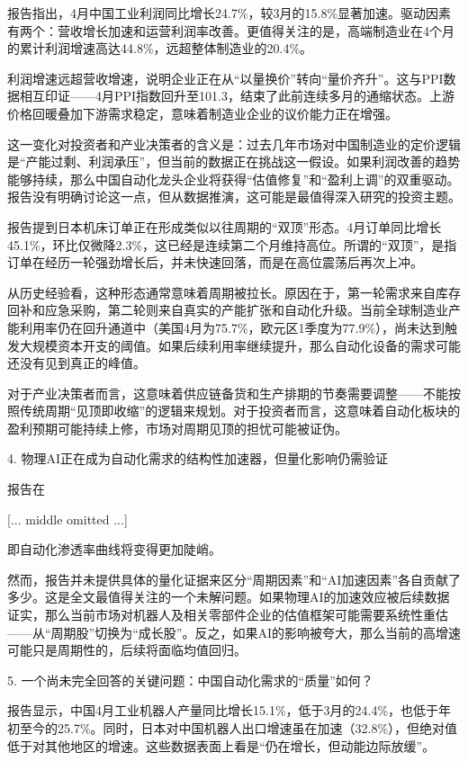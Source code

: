 \documentclass[11pt]{ctexart}
\begin{document}
报告指出，4月中国工业利润同比增长24.7\%，较3月的15.8\%显著加速。驱动因素有两个：营收增长加速和运营利润率改善。更值得关注的是，高端制造业在4个月的累计利润增速高达44.8\%，远超整体制造业的20.4\%。

利润增速远超营收增速，说明企业正在从“以量换价”转向“量价齐升”。这与PPI数据相互印证——4月PPI指数回升至101.3，结束了此前连续多月的通缩状态。上游价格回暖叠加下游需求稳定，意味着制造业企业的议价能力正在增强。

这一变化对投资者和产业决策者的含义是：过去几年市场对中国制造业的定价逻辑是“产能过剩、利润承压”，但当前的数据正在挑战这一假设。如果利润改善的趋势能够持续，那么中国自动化龙头企业将获得“估值修复”和“盈利上调”的双重驱动。报告没有明确讨论这一点，但从数据推演，这可能是最值得深入研究的投资主题。

报告提到日本机床订单正在形成类似以往周期的“双顶”形态。4月订单同比增长45.1\%，环比仅微降2.3\%，这已经是连续第二个月维持高位。所谓的“双顶”，是指订单在经历一轮强劲增长后，并未快速回落，而是在高位震荡后再次上冲。

从历史经验看，这种形态通常意味着周期被拉长。原因在于，第一轮需求来自库存回补和应急采购，第二轮则来自真实的产能扩张和自动化升级。当前全球制造业产能利用率仍在回升通道中（美国4月为75.7\%，欧元区1季度为77.9\%），尚未达到触发大规模资本开支的阈值。如果后续利用率继续提升，那么自动化设备的需求可能还没有见到真正的峰值。

对于产业决策者而言，这意味着供应链备货和生产排期的节奏需要调整——不能按照传统周期“见顶即收缩”的逻辑来规划。对于投资者而言，这意味着自动化板块的盈利预期可能持续上修，市场对周期见顶的担忧可能被证伪。

4. 物理AI正在成为自动化需求的结构性加速器，但量化影响仍需验证

报告在

[... middle omitted ...]

即自动化渗透率曲线将变得更加陡峭。

然而，报告并未提供具体的量化证据来区分“周期因素”和“AI加速因素”各自贡献了多少。这是全文最值得关注的一个未解问题。如果物理AI的加速效应被后续数据证实，那么当前市场对机器人及相关零部件企业的估值框架可能需要系统性重估——从“周期股”切换为“成长股”。反之，如果AI的影响被夸大，那么当前的高增速可能只是周期性的，后续将面临均值回归。

5. 一个尚未完全回答的关键问题：中国自动化需求的“质量”如何？

报告显示，中国4月工业机器人产量同比增长15.1\%，低于3月的24.4\%，也低于年初至今的25.7\%。同时，日本对中国机器人出口增速虽在加速（32.8\%），但绝对值低于对其他地区的增速。这些数据表面上看是“仍在增长，但动能边际放缓”。
\end{document}

